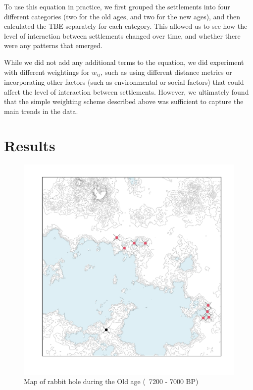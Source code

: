\documentclass[10pt]{paper}
\begin{document}
To use this equation in practice, we first grouped the settlements into four different categories (two for the old ages, and two for the new ages), and then calculated the TBE separately for each category. This allowed us to see how the level of interaction between settlements changed over time, and whether there were any patterns that emerged.

While we did not add any additional terms to the equation, we did experiment with different weightings for $w_{ij}$, such as using different distance metrics or incorporating other factors (such as environmental or social factors) that could affect the level of interaction between settlements. However, we ultimately found that the simple weighting scheme described above was sufficient to capture the main trends in the data.
\pagebreak

\section{Results}

\begin{figure}
    \centering
    \includegraphics[width=.65\textwidth]{oldages}
    \caption{Map of rabbit hole during the Old age (~7200 - 7000 BP)  }
    \label{fig:allage}
\end{figure}
\end{document}
